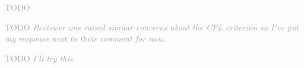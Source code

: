 \documentclass[times]{elsarticle}
\newcommand{\TODO}[1]{\textcolor{darkgray}{TODO \textit{#1}}}
\begin{document}
\begin{quotation}
\begin{comment}
\item It is claimed in several places that the scheme is stable, but some qualification
is appropriate. First, the scheme is {\it conditionally} stable; the Courant number
should not be too large. Then Appendix~A gives an analysis deriving constraints
on the polynomial reconstruction that should be satisfied for stability. However,
the analysis is idealized in various ways: one-dimensional, regular grid, constant $v$,
two- and three-cell stencils, and ignoring the time discretization (also see below).
That is fair enough---it might not be possible to generalize the analysis to the full
scheme---and it is clearly stated at the end of the Appendix that the constraints are
{\it hypothesized} to apply more generally. However, in section 2.1.4 the language is
stronger and suggests that these constraints are definitive: ``...stability constraints...'',
``...must satisfy...'', etc.
\end{comment}
\end{quotation}
\TODO{}

\begin{quotation}
\begin{comment}
\item P14. The calculation of the longest stable timestep {\it assumes} that the stability
limit is given by $\mathrm{Co}=1$. Given the idealized nature of the analysis in
Appendix~A, and that most experiments are done with $\mathrm{Co} \approx 0.4$,
at least some empirical investigation of the stability limit should be discussed
to confirm that it is indeed (exactly or approximately) $\mathrm{Co}=1$.
\end{comment}
\end{quotation}
\TODO{Reviewer one raised similar concerns about the CFL criterion so I've put my response next to their comment for now.}

\begin{quotation}
\begin{comment}
\item The presentation of the analysis in Appendix~A is somewhat confusing. It appears
to use a time discretization by introducing a time step $\Delta t$ and an amplification
factor $A$, (and hence a Courant number $v \Delta t / \Delta x$) whereas the
analysis is, in fact, continuous in time. It might be clearer to set
$\phi(x_j , t) = \hat{\phi}(t) \mathrm{e}^{i j k \Delta x}$ and form an ODE for
$\hat{\phi}$, etc. I think the conclusion would be the same.
\end{comment}
\end{quotation}
\TODO{I'll try this}
\end{document}
